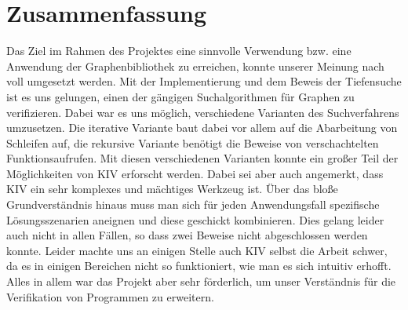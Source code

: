 ﻿\chapter{Zusammenfassung}
\label{chap:zusammenfassung}

Das Ziel im Rahmen des Projektes eine sinnvolle Verwendung bzw. eine Anwendung der Graphenbibliothek zu erreichen, konnte unserer Meinung nach voll umgesetzt werden. Mit der Implementierung und dem Beweis der Tiefensuche ist es uns gelungen, einen der gängigen Suchalgorithmen für Graphen zu verifizieren. Dabei war es uns möglich, verschiedene Varianten des Suchverfahrens umzusetzen. Die iterative Variante baut dabei vor allem auf die Abarbeitung von Schleifen auf, die rekursive Variante benötigt die Beweise von verschachtelten Funktionsaufrufen. Mit diesen verschiedenen Varianten konnte ein großer Teil der Möglichkeiten von KIV erforscht werden. Dabei sei aber auch angemerkt, dass KIV ein sehr komplexes und mächtiges Werkzeug ist. Über das bloße Grundverständnis hinaus muss man sich für jeden Anwendungsfall spezifische Lösungsszenarien aneignen und diese geschickt kombinieren. Dies gelang leider auch nicht in allen Fällen, so dass zwei Beweise nicht abgeschlossen werden konnte. Leider machte uns an einigen Stelle auch KIV selbst die Arbeit schwer, da es in einigen Bereichen nicht so funktioniert, wie man es sich intuitiv erhofft. Alles in allem war das Projekt aber sehr förderlich, um unser Verständnis für die Verifikation von Programmen zu erweitern.  
